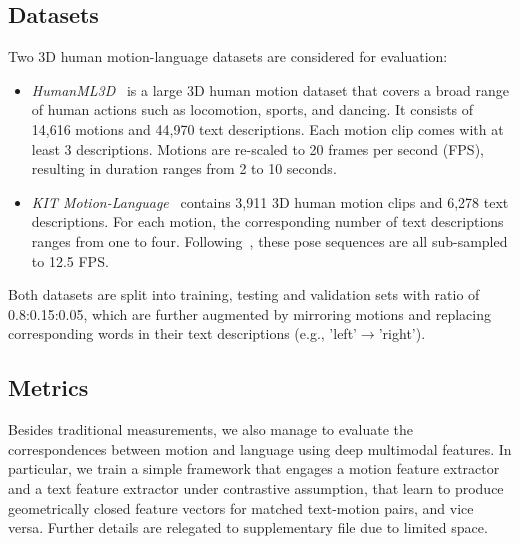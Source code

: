 \documentclass[runningheads]{llncs}
\newcommand{\beforesubsection}{\vspace{-2mm}}
\newcommand{\aftersubsection}{\vspace{-2mm}}
\begin{document}
\subsection{Datasets}
\aftersubsection
Two 3D human motion-language datasets are considered for evaluation:
\begin{itemize}
    \item \textit{HumanML3D}~\cite{guo2022generating} is a large 3D human motion dataset that covers a broad range of human actions such as locomotion, sports, and dancing. It consists of 14,616 motions and 44,970 text descriptions. Each motion clip comes with at least 3 descriptions. Motions are re-scaled to 20 frames per second (FPS), resulting in duration ranges from 2 to 10 seconds. 
    \item \textit{KIT Motion-Language}~\cite{plappert2016kit} contains 3,911 3D human motion clips and 6,278 text descriptions. For each motion, the corresponding number of text descriptions ranges from one to four. Following~\cite{ahuja2019language2pose,ghosh2021synthesis}, these pose sequences are all sub-sampled to 12.5 FPS.
\end{itemize}

Both datasets are split into training, testing and validation sets with ratio of 0.8:0.15:0.05, which are further augmented by mirroring motions and replacing corresponding words in their text descriptions (e.g., 'left'$\rightarrow$'right').

\beforesubsection
\subsection{Metrics}
\aftersubsection

Besides traditional measurements, we also manage to evaluate the correspondences between motion and language using deep multimodal features. In particular, we train a simple framework that engages a motion feature extractor and a text feature extractor under contrastive assumption, that learn to produce geometrically closed feature vectors for matched text-motion pairs, and vice versa. Further details are relegated to supplementary file due to limited space. 
\end{document}
